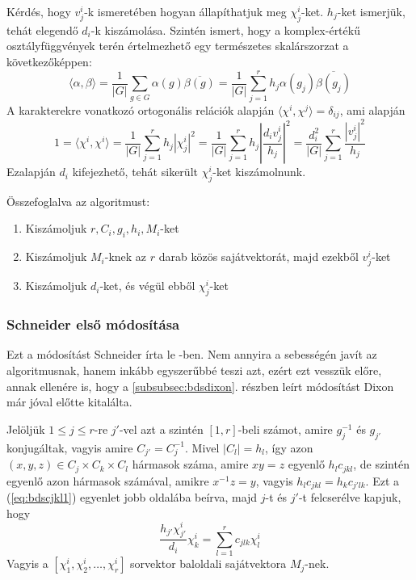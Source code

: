 Kérdés, hogy $v^i_j$-k ismeretében hogyan állapíthatjuk meg $\chi^i_j$-ket.
$h_j$-ket ismerjük, tehát elegendő $d_i$-k kiszámolása.
Szintén ismert, hogy a komplex-értékű osztályfüggvények terén értelmezhető egy természetes skalárszorzat a következőképpen:
\begin{equation}
\label{eq:bdsscalar}
\langle \alpha, \beta \rangle = \frac{1}{|G|}\sum_{g\in G}\alpha(g)\overline{\beta(g)} = \frac{1}{|G|}\sum_{j=1}^r h_j \alpha(g_j) \overline{\beta(g_j)}
\end{equation}
A karakterekre vonatkozó ortogonális relációk alapján $\langle \chi^i, \chi^j \rangle = \delta_{ij}$, ami alapján
\begin{equation}
\label{eq:bdsdi1}
1 = \langle \chi^i, \chi^i \rangle = \frac{1}{|G|}\sum_{j=1}^r h_j |\chi^i_j|^2 = \frac{1}{|G|}\sum_{j=1}^r h_j \left|\frac{d_i v^i_j}{h_j}\right|^2 = 
\frac{d_i^2}{|G|}\sum_{j=1}^r \frac{|v^i_j|^2}{h_j}
\end{equation}
Ezalapján $d_i$ kifejezhető, tehát sikerült $\chi^i_j$-ket kiszámolnunk.

\noindent
Összefoglalva az algoritmust:
\begin{enumerate}
\item Kiszámoljuk $r, C_i, g_i, h_i, M_i$-ket
\item Kiszámoljuk $M_i$-knek az $r$ darab közös sajátvektorát, majd ezekből $v^i_j$-ket
\item Kiszámoljuk $d_i$-ket, és végül ebből $\chi^i_j$-ket
\end{enumerate}

\subsubsection{Schneider első módosítása}
\label{subsubsec:bdssch1}
Ezt a módosítást Schneider írta le \cite{Sch90}-ben.
Nem annyira a sebességén javít az algoritmusnak, hanem inkább egyszerűbbé teszi azt, ezért ezt vesszük előre,
annak ellenére is, hogy a \ref{subsubsec:bdsdixon}. részben leírt módosítást Dixon már jóval előtte kitalálta.

Jelöljük $1\le j \le r$-re $j'$-vel azt a szintén $[1, r]$-beli számot, amire $g_j^{-1}$ és $g_{j'}$ konjugáltak,
vagyis amire $C_{j'}=C_j^{-1}$. Mivel $|C_l|=h_l$, így azon $(x, y, z)\in C_j \times C_k \times C_l$ hármasok száma,
amire $xy=z$ egyenlő $h_l c_{jkl}$, de szintén egyenlő azon hármasok számával, amikre $x^{-1}z=y$, vagyis $h_l c_{jkl}=h_k c_{j'lk}$.
Ezt a (\ref{eq:bdscjkl1}) egyenlet jobb oldalába beírva, majd $j$-t és $j'$-t felcserélve kapjuk, hogy
\begin{equation}
\label{eq:bdssch1}
\frac{h_{j'}\chi^i_{j'}}{d_i}\chi^i_k=\sum_{l=1}^r c_{jlk}\chi^i_l
\end{equation}
Vagyis a $[\chi^i_1, \chi^i_2, \dots, \chi^i_r]$ sorvektor baloldali sajátvektora $M_j$-nek.

